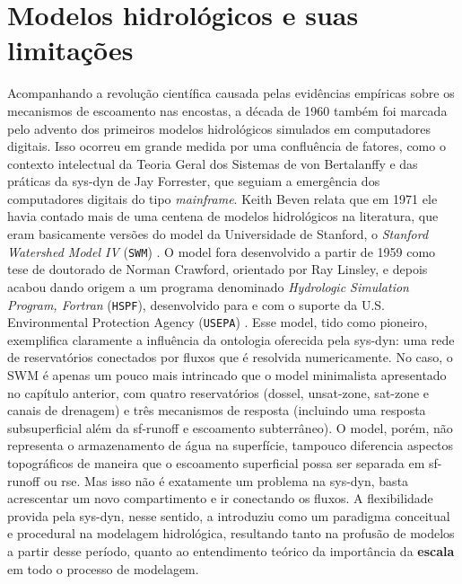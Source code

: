 \documentclass[./main.tex]{subfiles}
\begin{document}
\section{Modelos hidrológicos e suas limitações} \label{sec:hydro:others}

\par Acompanhando a revolução científica causada pelas evidências empíricas sobre os mecanismos de escoamento nas encostas, a década de 1960 também foi marcada pelo advento dos primeiros modelos hidrológicos simulados em computadores digitais. Isso ocorreu em grande medida por uma confluência de fatores, como o contexto intelectual da Teoria Geral dos Sistemas de von Bertalanffy e das práticas da \gls{sys-dyn} de Jay Forrester, que seguiam a emergência dos computadores digitais do tipo \textit{mainframe}. Keith Beven relata que em 1971 ele havia contado mais de uma centena de modelos hidrológicos na literatura, que eram basicamente versões do \gls{model} da Universidade de Stanford, o \textit{Stanford Watershed Model IV} (\texttt{SWM}) \cite{Beven2019a}. O \gls{model} fora desenvolvido a partir de 1959 como tese de doutorado de Norman Crawford, orientado por Ray Linsley, e depois acabou dando origem a um programa denominado \textit{Hydrologic Simulation Program, Fortran} (\texttt{HSPF}), desenvolvido para e com o suporte da U.S. Environmental Protection Agency (\texttt{USEPA}) \cite{Burges2004a}. Esse \gls{model}, tido como pioneiro, exemplifica claramente a influência da ontologia oferecida pela \gls{sys-dyn}: uma rede de reservatórios conectados por fluxos que é resolvida numericamente. No caso, o SWM é apenas um pouco mais intrincado que o \gls{model} minimalista apresentado no capítulo anterior, com quatro reservatórios (dossel, \gls{unsat-zone}, \gls{sat-zone} e canais de drenagem) e três mecanismos de resposta (incluindo uma resposta subsuperficial além da \gls{sf-runoff} e escoamento subterrâneo). O \gls{model}, porém, não representa o armazenamento de água na superfície, tampouco diferencia aspectos topográficos de maneira que o escoamento superficial possa ser separada em \gls{sf-runoff} ou \gls{rse}. Mas isso não é exatamente um problema na \gls{sys-dyn}, basta acrescentar um novo compartimento e ir conectando os fluxos. A flexibilidade provida pela \gls{sys-dyn}, nesse sentido, a introduziu como um \gls{paradigma} conceitual e procedural na modelagem hidrológica, resultando tanto na profusão de modelos a partir desse período, quanto ao entendimento teórico da importância da \textbf{escala} em todo o processo de modelagem.
\end{document}
